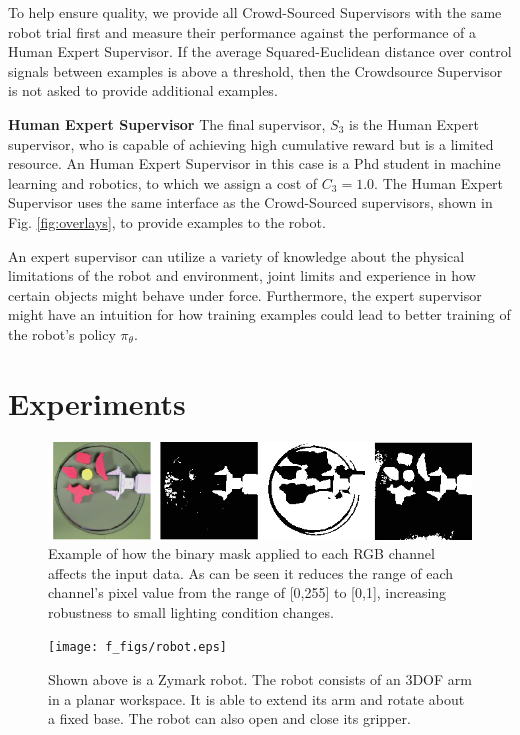 \documentclass[10pt, conference]{ieeeconf}      %
\begin{document}
To help ensure quality, we provide all Crowd-Sourced Supervisors with the same robot trial first and measure their
performance against the performance of a Human Expert Supervisor. If the average Squared-Euclidean distance over control
signals between examples is above a threshold, then the Crowdsource Supervisor is not asked to provide additional examples.

\noindent \textbf{Human Expert Supervisor} The final supervisor, $S_3$ is the Human Expert supervisor, who is capable of
achieving high cumulative reward but is a limited resource. An Human Expert Supervisor in this case is a Phd student in
machine learning and robotics, to which we assign a cost of $C_3=1.0$. The Human Expert Supervisor uses the same
interface as the Crowd-Sourced supervisors, shown in Fig. \ref{fig:overlays}, to provide examples to the robot.  

An expert supervisor can utilize a variety of knowledge about the physical limitations of the robot and environment,
joint limits and experience in how certain objects might behave under force. Furthermore, the expert supervisor might
have an intuition for how training examples could lead to better training of the robot's policy $\pi_\theta$. 


\section{Experiments} \label{sec:Exp}

\begin{figure}[t]
\centering

\includegraphics{f_figs/binary_segment.eps}

\caption{\footnotesize Example of how the binary mask applied to each RGB channel affects the input data. As can be seen
it reduces the range of each channel's pixel value from the range of [0,255] to [0,1], increasing robustness to small
lighting condition changes.  }

\label{fig:b_seg}
\end{figure}



\begin{figure}[t]
\centering

\texttt{[image: f\_figs/robot.eps]}

\caption{\footnotesize  Shown above is a Zymark robot. The robot consists of an 3DOF arm in a planar workspace. It is able to extend its arm and rotate about a fixed base. The robot can also open and close its gripper.}

\label{fig:robot}
\end{figure}
\end{document}
